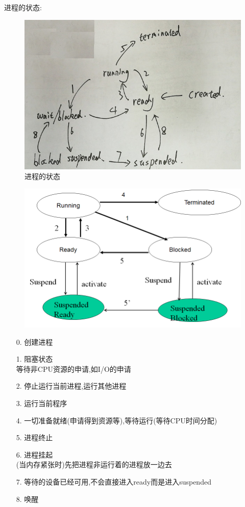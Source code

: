 \documentclass[UTF8,a4paper]{ctexart}
\begin{document}
进程的状态:
\begin{figure}[H]
	\centering
	\includegraphics[scale = 0.3]{assets/caozuoxitong_fe21f.png}
	\caption{进程的状态}
\end{figure}
\begin{figure}[H]
	\centering
	\includegraphics[scale = 0.3]{assets/ModernOperatingSystems_ef0b3.png}
\end{figure}

\begin{itemize}
	\item [0.] 创建进程
	\item [1.] 阻塞状态\\
	      等待非CPU资源的申请,如I/O的申请
	\item [2.] 停止运行当前进程,运行其他进程
	\item [3.] 运行当前程序
	\item [4.] 一切准备就绪(申请得到资源等),等待运行(等待CPU时间分配)
	\item [5.] 进程终止
	\item [6.] 进程挂起\\
	      (当内存紧张时)先把进程非运行着的进程放一边去
	\item [7.] 等待的设备已经可用,不会直接进入ready而是进入suspended
	\item [8.] 唤醒

\end{itemize}
\end{document}

